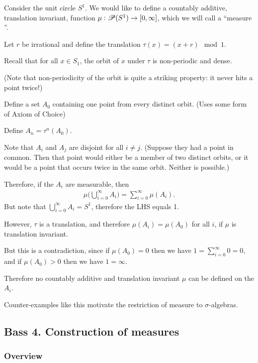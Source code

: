 \begin{example}
  Consider the unit circle $S^1$. We would like to define a countably additive, translation invariant,
  function $\mu:\mathscr{P}(S^1) \to [0, \infty]$, which we will call a ``measure​''.

  Let $r$ be irrational and define the translation $\tau(x) = (x + r) \mod 1$.

  Recall that for all $x \in S_1$, the orbit of $x$ under $\tau$ is non-periodic and dense.

  (Note that non-periodicity of the orbit is quite a striking property: it never hits a point twice!)

  Define a set $A_0$ containing one point from every distinct orbit. (Uses some form of Axiom of Choice)

  Define $A_n = \tau^n(A_0)$.

  Note that $A_i$ and $A_j$ are disjoint for all $i \neq j$. (Suppose they had a point in common. Then that
  point would either be a member of two distinct orbits, or it would be a point that occurs twice in the same
  orbit. Neither is possible.)

  Therefore, if the $A_i$ are measurable, then
  \begin{align*}
    \mu\Big(\bigcup_{i=0}^\infty A_i\Big) = \sum_{i=0}^\infty \mu(A_i).
  \end{align*}
  But note that $\bigcup_{i=0}^\infty A_i = S^1$, therefore the LHS equals 1.

  However, $\tau$ is a translation, and therefore $\mu(A_i) = \mu(A_0)$ for all $i$, if $\mu$ is translation
  invariant.

  But this is a contradiction, since if $\mu(A_0) = 0$ then we have $1 = \sum_{i=0}^\infty 0 = 0$, and
  if $\mu(A_0) > 0$ then we have $1 = \infty$.

  Therefore no countably additive and translation invariant $\mu$ can be defined on the $A_i$.

  Counter-examples like this motivate the restriction of measure to $\sigma$-algebras.
\end{example}




\subsection{Bass 4.  Construction of measures}

\subsubsection{Overview}

